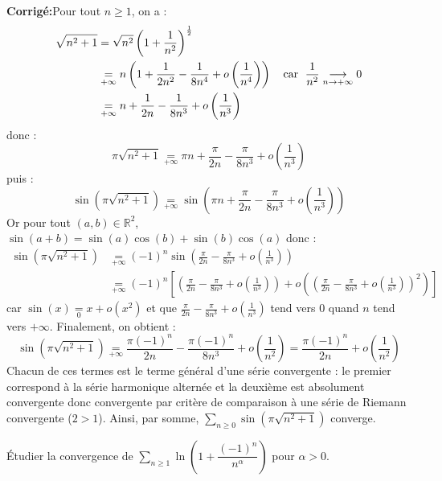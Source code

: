 \documentclass[a4paper,twoside,french,10pt]{VcCours}
\newcommand{\corr}{\textbf{Corrigé:}}
\newcommand{\Sum}[2]{\ensuremath{\textstyle{\sum\limits_{#1}^{#2}}}}
\begin{document}
\corr Pour tout $n \geq 1$, on a :
\begin{align*}
\sqrt {n^2 + 1} & = \sqrt{n^2} \left( 1 + \frac{1}{n^2} \right)^{\frac{1}{2}} \\
& \underset{+ \infty}{=} n \left(1 + \frac{1}{2n^2} - \frac{1}{8n^4} + o \left( \frac{1}{n^4} \right) \right) \quad \hbox{car } \; \frac{1}{n^2} \underset{n \rightarrow + \infty}{\longrightarrow} 0\\
& \underset{+ \infty}{=} n + \frac{1}{2n} - \frac{1}{8n^3} +  o \left( \frac{1}{n^3} \right)  
\end{align*}
donc :
$$ \pi \sqrt {n^2 + 1} \underset{+ \infty}{=} \pi n + \frac{\pi}{2n} - \frac{\pi}{8n^3} +  o \left( \frac{1}{n^3} \right)  $$
puis :
$$\sin \left({\pi \sqrt {n^2 + 1}} \right)  \underset{+ \infty}{=} \sin \left(  \pi n + \frac{\pi}{2n} - \frac{\pi}{8n^3} +  o \left( \frac{1}{n^3} \right) \right)$$
Or pour tout $(a,b) \in \mathbb{R}^2$, $\sin(a+b)= \sin(a)\cos(b)+\sin(b) \cos(a)$ donc :
\begin{align*}
 \sin \left({\pi \sqrt {n^2 + 1}} \right)& \underset{+ \infty}{=} (-1)^n \sin \left(\frac{\pi}{2n} - \frac{\pi}{8n^3} +  o \left( \frac{1}{n^3} \right) \right) \\
 & \underset{+ \infty}{=} (-1)^n \left[\left(\frac{\pi}{2n} - \frac{\pi}{8n^3} +  o \left( \frac{1}{n^3} \right) \right) + o \left( \left(\frac{\pi}{2n} - \frac{\pi}{8n^3} +  o \left( \frac{1}{n^3} \right) \right)^2 \right) \right] 
 \end{align*}
car $\sin(x) \underset{0}{=} x + o(x^2)$ et que $\frac{\pi}{2n} - \frac{\pi}{8n^3} +  o \left( \frac{1}{n^3} \right)$ tend vers $0$ quand $n$ tend vers $+ \infty$. Finalement, on obtient :
$$ \sin \left({\pi \sqrt {n^2 + 1}} \right) \underset{+ \infty}{=} \frac{\pi (-1)^n}{2n} - \frac{\pi (-1)^n}{8n^3} +  o \left( \frac{1}{n^2} \right) = \frac{\pi (-1)^n}{2n} +  o \left( \frac{1}{n^2} \right)$$
Chacun de ces termes est le terme général d'une série convergente : le premier correspond à la série harmonique alternée et la deuxième est absolument convergente donc convergente par critère de comparaison à une série de Riemann convergente ($2>1$). Ainsi, par somme, $\Sum{n \geq 0}{} \sin \left({\pi \sqrt {n^2 + 1}} \right)$ converge.

\medskip



\begin{Exercice}{} Étudier la convergence de $\Sum{n \geq 1}{} \ln \left( 1 + \dfrac{(-1)^n}{n^{\alpha}} \right)$ pour $\alpha>0$.
\end{Exercice} 
\end{document}
